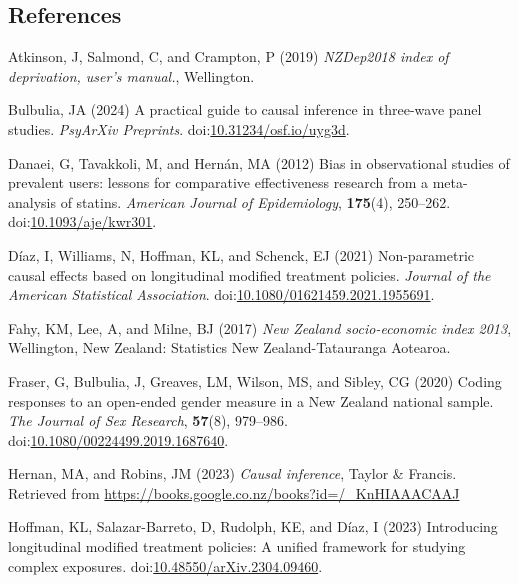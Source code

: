 \documentclass[
  singlecolumn]{article}
\newlength{\cslhangindent}
\newenvironment{CSLReferences}[2] %
 {\begin{list}{}{%
  \setlength{\itemindent}{0pt}
  \setlength{\leftmargin}{0pt}
  \setlength{\parsep}{0pt}
  \ifodd #1
   \setlength{\leftmargin}{\cslhangindent}
   \setlength{\itemindent}{-1\cslhangindent}
  \fi
  \setlength{\itemsep}{#2\baselineskip}}}
 {\end{list}}
\begin{document}
\newpage{}

\subsection{References}\label{references}

\label{refs}
\begin{CSLReferences}{1}{0}
Atkinson, J, Salmond, C, and Crampton, P (2019) \emph{NZDep2018 index of
deprivation, user{'}s manual.}, Wellington.

Bulbulia, JA (2024) A practical guide to causal inference in three-wave
panel studies. \emph{PsyArXiv Preprints}.
doi:\href{https://doi.org/10.31234/osf.io/uyg3d}{10.31234/osf.io/uyg3d}.

Danaei, G, Tavakkoli, M, and Hernán, MA (2012) Bias in observational
studies of prevalent users: lessons for comparative effectiveness
research from a meta-analysis of statins. \emph{American Journal of
Epidemiology}, \textbf{175}(4), 250--262.
doi:\href{https://doi.org/10.1093/aje/kwr301}{10.1093/aje/kwr301}.

Díaz, I, Williams, N, Hoffman, KL, and Schenck, EJ (2021) Non-parametric
causal effects based on longitudinal modified treatment policies.
\emph{Journal of the American Statistical Association}.
doi:\href{https://doi.org/10.1080/01621459.2021.1955691}{10.1080/01621459.2021.1955691}.

Fahy, KM, Lee, A, and Milne, BJ (2017) \emph{{N}ew {Z}ealand
socio-economic index 2013}, Wellington, New Zealand: Statistics New
Zealand-Tatauranga Aotearoa.

Fraser, G, Bulbulia, J, Greaves, LM, Wilson, MS, and Sibley, CG (2020)
Coding responses to an open-ended gender measure in a {N}ew {Z}ealand
national sample. \emph{The Journal of Sex Research}, \textbf{57}(8),
979--986.
doi:\href{https://doi.org/10.1080/00224499.2019.1687640}{10.1080/00224499.2019.1687640}.

Hernan, MA, and Robins, JM (2023) \emph{Causal inference}, Taylor \&
Francis. Retrieved from
\url{https://books.google.co.nz/books?id=/_KnHIAAACAAJ}

Hoffman, KL, Salazar-Barreto, D, Rudolph, KE, and Díaz, I (2023)
Introducing longitudinal modified treatment policies: A unified
framework for studying complex exposures.
doi:\href{https://doi.org/10.48550/arXiv.2304.09460}{10.48550/arXiv.2304.09460}.


\end{CSLReferences}
\end{document}
